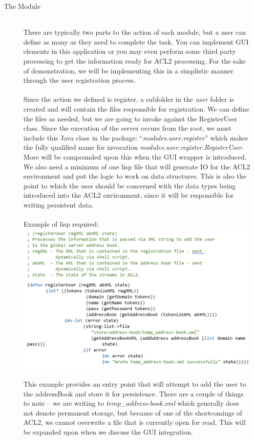 \documentclass[11pt, letterpaper]{report}
\begin{document}
\begin{description}
\item[The Module]\hfill \\
There are typically two parts to the action of each module, but a user can define as many as they need to complete the task.  You can implement GUI elements in this application or you may even perform some third party processing to get the information ready for ACL2 processing.  For the sake of demonstration, we will be implementing this in a simplistic manner through the user registration process.\\\\
Since the action we defined is register, a subfolder in the \textit{user} folder is created and will contain the files responsible for registration.  We can define the files as needed, but we are going to invoke against the RegisterUser class.  Since the execution of the server occurs from the root, we must include this Java class in the package: ``\textit{modules.user.register}'' which makes the fully qualified name for invocation \textit{modules.user.register.RegisterUser}.  More will be compounded upon this when the GUI wrapper is introduced.  We also need a minimum of one lisp file that will generate IO for the ACL2 environment and put the logic to work on data structures.  This is also the point to which the user should be concerned with the data types being introduced into the ACL2 environment, since it will be responsible for writing persistent data.\\\\
Example of lisp required:\\
\includegraphics[scale=0.5]{lisp}\\\\
This example provides an entry point that will attempt to add the user to the addressBook and store it for persistence.  There are a couple of things to note – we are writing to \textit{temp\_address-book.xml} which generally does not denote permanent storage, but because of one of the shortcomings of ACL2, we cannot overwrite a file that is currently open for read.  This will be expanded upon when we discuss the GUI integration. \\


\end{description}
\end{document}
